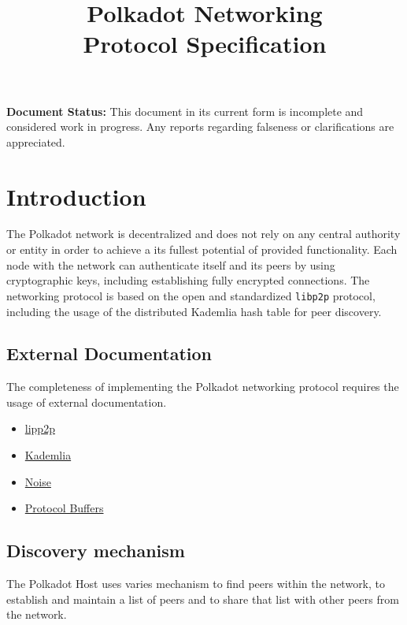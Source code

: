 \documentclass{book}
\begin{document}
\title{{\Huge Polkadot Networking}\\
    {\Large Protocol Specification}}

\date{}
\maketitle
\tableofcontents
\newpage

\textbf{Document Status:} This document in its current form is incomplete and
considered work in progress. Any reports regarding falseness or clarifications
are appreciated.

\section{Introduction}

The Polkadot network is decentralized and does not rely on any central authority
or entity in order to achieve a its fullest potential of provided functionality.
Each node with the network can authenticate itself and its peers by using
cryptographic keys, including establishing fully encrypted connections. The
networking protocol is based on the open and standardized \verb|libp2p|
protocol, including the usage of the distributed Kademlia hash table for peer
discovery.

\subsection{External Documentation}

The completeness of implementing the Polkadot networking protocol requires the
usage of external documentation.

\begin{itemize}
    \item 
    \href{https://github.com/libp2p/specs}{lipp2p}
    \item 
    \href{https://en.wikipedia.org/wiki/Kademlia}{Kademlia}
    \item \href{https://noiseprotocol.org/}{Noise}
    \item
    \href{https://developers.google.com/protocol-buffers/docs/reference/proto3-spec}{Protocol
    Buffers}
\end{itemize}

\subsection{Discovery mechanism}

The Polkadot Host uses varies mechanism to find peers within the network, to
establish and maintain a list of peers and to share that list with other peers
from the network.
\newline
\end{document}
